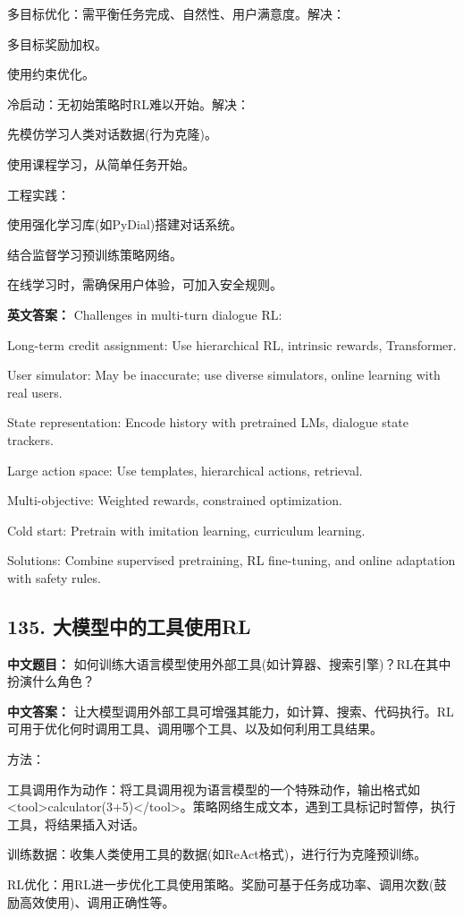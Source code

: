 \documentclass[10pt,a4paper]{ctexart}
\begin{document}
多目标优化：需平衡任务完成、自然性、用户满意度。解决：

多目标奖励加权。

使用约束优化。

冷启动：无初始策略时RL难以开始。解决：

先模仿学习人类对话数据(行为克隆)。

使用课程学习，从简单任务开始。

工程实践：

使用强化学习库(如PyDial)搭建对话系统。

结合监督学习预训练策略网络。

在线学习时，需确保用户体验，可加入安全规则。

\textbf{英文答案：}
Challenges in multi-turn dialogue RL:

Long-term credit assignment: Use hierarchical RL, intrinsic rewards, Transformer.

User simulator: May be inaccurate; use diverse simulators, online learning with real users.

State representation: Encode history with pretrained LMs, dialogue state trackers.

Large action space: Use templates, hierarchical actions, retrieval.

Multi-objective: Weighted rewards, constrained optimization.

Cold start: Pretrain with imitation learning, curriculum learning.

Solutions: Combine supervised pretraining, RL fine-tuning, and online adaptation with safety rules.

\subsection*{135. 大模型中的工具使用RL}
\textbf{中文题目：} 如何训练大语言模型使用外部工具(如计算器、搜索引擎)？RL在其中扮演什么角色？

\textbf{中文答案：}
让大模型调用外部工具可增强其能力，如计算、搜索、代码执行。RL可用于优化何时调用工具、调用哪个工具、以及如何利用工具结果。

方法：

工具调用作为动作：将工具调用视为语言模型的一个特殊动作，输出格式如 <tool>calculator(3+5)</tool>。策略网络生成文本，遇到工具标记时暂停，执行工具，将结果插入对话。

训练数据：收集人类使用工具的数据(如ReAct格式)，进行行为克隆预训练。

RL优化：用RL进一步优化工具使用策略。奖励可基于任务成功率、调用次数(鼓励高效使用)、调用正确性等。
\end{document}
